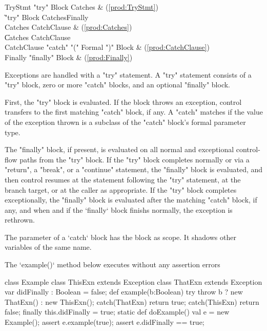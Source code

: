 \begin{bbgrammar}
             TryStmt \: \xcd"try" Block Catches & (\ref{prod:TryStmt}) \\
                     \| \xcd"try" Block Catches\opt Finally \\
             Catches \: CatchClause & (\ref{prod:Catches}) \\
                     \| Catches CatchClause \\
         CatchClause \: \xcd"catch" \xcd"(" Formal \xcd")" Block & (\ref{prod:CatchClause}) \\
             Finally \: \xcd"finally" Block & (\ref{prod:Finally}) \\
\end{bbgrammar}

Exceptions are handled with a \xcd"try" statement.
A \xcd"try" statement consists of a \xcd"try" block, zero or more
\xcd"catch" blocks, and an optional \xcd"finally" block.

First, the \xcd"try" block is evaluated.  If the block throws an
exception, control transfers to the first matching \xcd"catch"
block, if any.  A \xcd"catch" matches if the value of the
exception thrown is a subclass of the \xcd"catch" block's formal
parameter type.

The \xcd"finally" block, if present, is evaluated on all normal
and exceptional control-flow paths from the \xcd"try" block.
If the \xcd"try" block completes normally
or via a \xcd"return", a \xcd"break", or a
\xcd"continue" statement, 
the \xcd"finally"
block is evaluated, and then control resumes at
the statement following the \xcd"try" statement, at the branch target, or at
the caller as appropriate.
If the \xcd"try" block completes
exceptionally, the \xcd"finally" block is evaluated after the
matching \xcd"catch" block, if any, and when and if the \xcd`finally` block
finishs normally, the
exception is rethrown.


The parameter of a \xcd`catch` block has the block as scope.  It shadows other
variables of the same name.

\begin{ex}
The \xcd`example()` method below executes without any assertion errors
% 
\begin{xten}
class Example {
  class ThisExn extends Exception {}
  class ThatExn extends Exception {}
  var didFinally : Boolean = false;
  def example(b:Boolean) {
    try {
       throw b ? new ThatExn() : new ThisExn();
    }
    catch(ThatExn) {return true;}
    catch(ThisExn) {return false;}
    finally {
       this.didFinally = true;
    }
  }
  static def doExample() {
    val e = new Example();
    assert e.example(true);
    assert e.didFinally == true;
  }
}
\end{xten}
% 

\end{ex}

